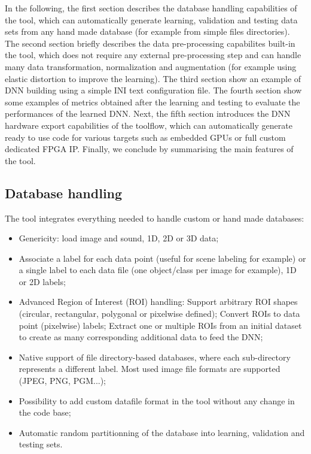 \documentclass[a4paper,11pt,oneside]{article}
\newenvironment{myitemize}
{ \begin{itemize}
    \setlength{\itemsep}{0pt}
    \setlength{\parskip}{0pt}
    \setlength{\parsep}{0pt}     }
{ \end{itemize}                  }
\begin{document}
In the following, the first section describes the database handling capabilities
of the tool, which can automatically generate learning, validation and testing
data sets from any hand made database (for example from simple files
directories). The second section briefly describes the data pre-processing
capabilites built-in the tool, which does not require any external
pre-processing step and can handle many data transformation, normalization and
augmentation (for example using elastic distortion to improve the learning).
The third section show an example of DNN building using a simple INI text
configuration file. The fourth section show some examples of metrics obtained
after the learning and testing to evaluate the performances of the learned DNN.
Next, the fifth section introduces the DNN hardware export capabilities of the
toolflow, which can automatically generate ready to use code for various
targets such as embedded GPUs or full custom dedicated FPGA IP. Finally, we
conclude by summarising the main features of the tool.


\subsection{Database handling}

The tool integrates everything needed to handle custom or hand made databases:
\begin{myitemize}
    \item Genericity: load image and sound, 1D, 2D or 3D data;
    \item Associate a label for each data point (useful for scene labeling for
    example) or a single label to each data file (one object/class per image for
     example), 1D or 2D labels;
    \item Advanced Region of Interest (ROI) handling:
    \subitem Support arbitrary ROI shapes (circular, rectangular, polygonal or
    pixelwise defined);
    \subitem Convert ROIs to data point (pixelwise) labels;
    \subitem Extract one or multiple ROIs from an initial dataset to create as
    many corresponding additional data to feed the DNN;
    \item Native support of file directory-based databases, where each
    sub-directory represents a different label. Most used image file formats are
     supported (JPEG, PNG, PGM...);
    \item Possibility to add custom datafile format in the tool without any
    change in the code base;
    \item Automatic random partitionning of the database into learning,
    validation and testing sets.
\end{myitemize}
\end{document}
